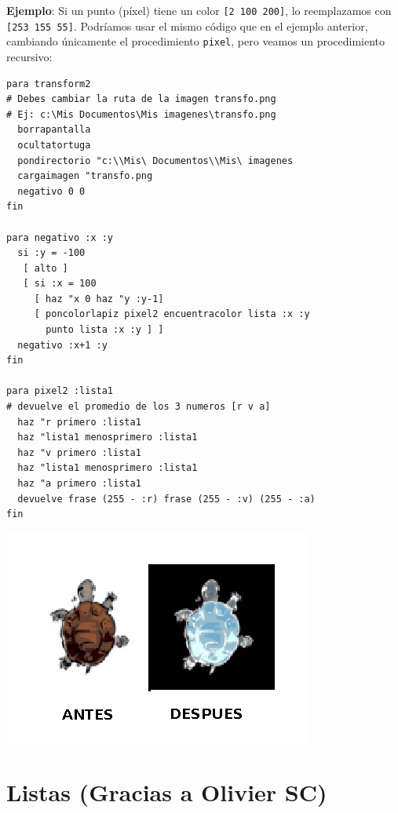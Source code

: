 \noindent \textbf{Ejemplo}: Si un punto (p\'ixel) tiene un color
\texttt{[2~100~200]}, lo reemplazamos con \texttt{[253~155~55]}.
Podr\'iamos usar el mismo c\'odigo que en el ejemplo anterior,
cambiando \'unicamente el procedimiento \texttt{pixel}, pero veamos
un procedimiento recursivo:
\begin{verbatim}
para transform2
# Debes cambiar la ruta de la imagen transfo.png
# Ej: c:\Mis Documentos\Mis imagenes\transfo.png
  borrapantalla
  ocultatortuga
  pondirectorio "c:\\Mis\ Documentos\\Mis\ imagenes
  cargaimagen "transfo.png
  negativo 0 0
fin

para negativo :x :y
  si :y = -100
   [ alto ]
   [ si :x = 100
     [ haz "x 0 haz "y :y-1]
     [ poncolorlapiz pixel2 encuentracolor lista :x :y
       punto lista :x :y ] ] 
  negativo :x+1 :y
fin

para pixel2 :lista1
# devuelve el promedio de los 3 numeros [r v a]
  haz "r primero :lista1 
  haz "lista1 menosprimero :lista1 
  haz "v primero :lista1 
  haz "lista1 menosprimero :lista1 
  haz "a primero :lista1 
  devuelve frase (255 - :r) frase (255 - :v) (255 - :a)
fin \end{verbatim}
\begin{center}
   \includegraphics[scale=0.6]{Imagenes/13_Ejemplos/colores2.png}
\end{center}

\section{Listas (Gracias a Olivier SC)}
   \label{Ejemplo-Listas}

